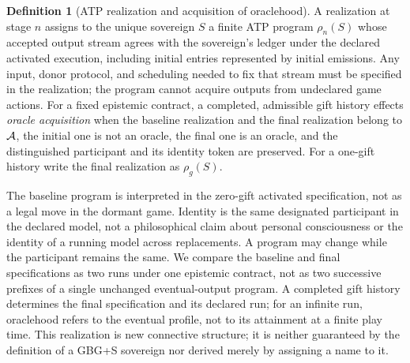 \documentclass[11pt]{article}
\theoremstyle{definition}\newtheorem{definition}[theorem]{Definition}
\begin{document}
\begin{definition}[ATP realization and acquisition of oraclehood]
A realization at stage $n$ assigns to the unique sovereign $S$ a finite ATP program $\rho_n(S)$ whose accepted output stream agrees with the sovereign's ledger under the declared activated execution, including initial entries represented by initial emissions. Any input, donor protocol, and scheduling needed to fix that stream must be specified in the realization; the program cannot acquire outputs from undeclared game actions. For a fixed epistemic contract, a completed, admissible gift history effects \emph{oracle acquisition} when the baseline realization and the final realization belong to $\mathcal A$, the initial one is not an oracle, the final one is an oracle, and the distinguished participant and its identity token are preserved. For a one-gift history write the final realization as $\rho_g(S)$.
\end{definition}
The baseline program is interpreted in the zero-gift activated specification, not as a legal move in the dormant game. Identity is the same designated participant in the declared model, not a philosophical claim about personal consciousness or the identity of a running model across replacements. A program may change while the participant remains the same. We compare the baseline and final specifications as two runs under one epistemic contract, not as two successive prefixes of a single unchanged eventual-output program. A completed gift history determines the final specification and its declared run; for an infinite run, oraclehood refers to the eventual profile, not to its attainment at a finite play time. This realization is new connective structure; it is neither guaranteed by the definition of a GBG+S sovereign nor derived merely by assigning a name to it.
\end{document}
